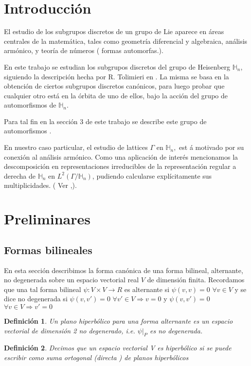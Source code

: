 \documentclass[12pt]{article}
\newtheorem{definition}{Definición}
\begin{document}
\section{Introducción}
El estudio de los subgrupos discretos de un grupo de Lie aparece en áreas
centrales de la matemática, tales como geometría diferencial y
algebraica, análisis armónico, y teoría de números ( formas
automorfas.)\bigskip .

En este trabajo se estudian los subgrupos discretos del grupo de Heisenberg 
$\mathbb{H}_n$, siguiendo la descripción hecha por R. Tolimieri en \cite{To}.
La misma se basa en la obtención de ciertos subgrupos
discretos canónicos, para luego probar que cualquier otro está en la 
órbita de uno de ellos, bajo la acción del grupo de automorfismos de 
$\mathbb{H}_n.$

Para tal fin en la sección 3 de este trabajo se describe este grupo de
automorfismos .

En nuestro caso particular, el estudio de lattices $\Gamma $ en $\mathbb{H}_n,$ est%
á motivado por su conexión al análisis armónico. Como una
aplicación de inter\'{e}s mencionamos la descomposición en
representaciones irreducibles de la representación regular a derecha de
$\mathbb{H}_n$ en $L^2(\Gamma /\mathbb{H}_n)$, pudiendo calcularse
explícitamente sus multiplicidades. ( Ver \cite{Fo} ,\cite{Th}).

\section{Preliminares}
\subsection{Formas bilineales}
En esta sección describimos la forma canónica de una forma bilineal,
alternante, no degenerada sobre un espacio vectorial real $V$ de dimensión finita. 
Recordamos que una tal forma bilineal $\psi :V\times V\rightarrow R$
es alternante si $\psi(v,v)=0$ $\forall v \in V$  y se dice no degenerada si 
$\psi(v,v')=0$ $\forall v' \in V \Rightarrow v = 0$  y 
$\psi(v,v')=0$ $\forall v \in V \Rightarrow v' = 0$

\begin{definition} 
 Un plano hiperbólico para una forma alternante es un espacio vectorial de dimensión 2 no degenerado,
  i.e. $\psi|_P$ es no degenerada. 
\end{definition}

\begin{definition}   
 Decimos que un espacio vectorial V es hiperbólico si se puede escribir como suma ortogonal (directa ) de
 planos hiperbólicos
\end{definition}
\end{document}
